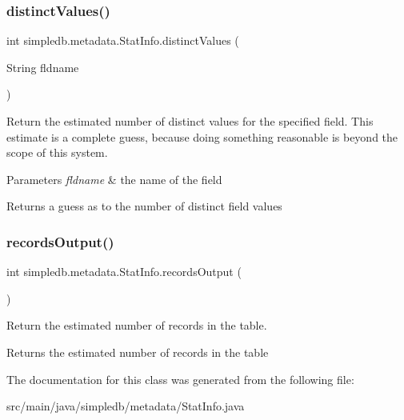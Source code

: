 \subsubsection{\texorpdfstring{distinct\+Values()}{distinctValues()}}
{\footnotesize\ttfamily int simpledb.\+metadata.\+Stat\+Info.\+distinct\+Values (\begin{DoxyParamCaption}\item[{String}]{fldname }\end{DoxyParamCaption})\hspace{0.3cm}{\ttfamily [inline]}}

Return the estimated number of distinct values for the specified field. This estimate is a complete guess, because doing something reasonable is beyond the scope of this system. 
\begin{DoxyParams}{Parameters}
{\em fldname} & the name of the field \\
\hline
\end{DoxyParams}
\begin{DoxyReturn}{Returns}
a guess as to the number of distinct field values 
\end{DoxyReturn}
\mbox{\label{classsimpledb_1_1metadata_1_1StatInfo_a44040cb918b4c2130605e43e06d7e833}} 
\subsubsection{\texorpdfstring{records\+Output()}{recordsOutput()}}
{\footnotesize\ttfamily int simpledb.\+metadata.\+Stat\+Info.\+records\+Output (\begin{DoxyParamCaption}{ }\end{DoxyParamCaption})\hspace{0.3cm}{\ttfamily [inline]}}

Return the estimated number of records in the table. \begin{DoxyReturn}{Returns}
the estimated number of records in the table 
\end{DoxyReturn}


The documentation for this class was generated from the following file\+:\begin{DoxyCompactItemize}
\item 
src/main/java/simpledb/metadata/Stat\+Info.\+java\end{DoxyCompactItemize}

